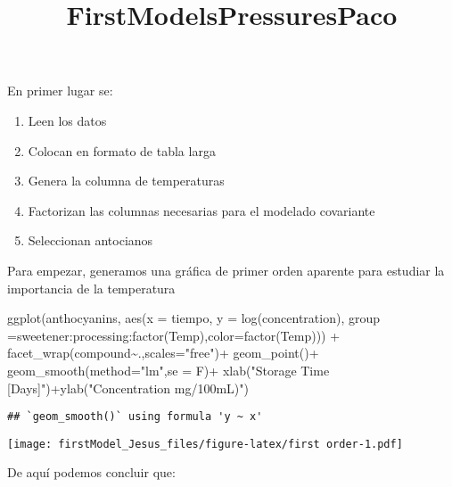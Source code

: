 \documentclass[
]{article}
\title{FirstModelsPressuresPaco}
\author{}
\date{\vspace{-2.5em}}
\newenvironment{Shaded}{\begin{snugshade}}{\end{snugshade}}
\newcommand{\AttributeTok}[1]{\textcolor[rgb]{0.77,0.63,0.00}{#1}}
\newcommand{\FunctionTok}[1]{\textcolor[rgb]{0.00,0.00,0.00}{#1}}
\newcommand{\NormalTok}[1]{#1}
\newcommand{\SpecialCharTok}[1]{\textcolor[rgb]{0.00,0.00,0.00}{#1}}
\newcommand{\StringTok}[1]{\textcolor[rgb]{0.31,0.60,0.02}{#1}}
\providecommand{\tightlist}{%
  \setlength{\itemsep}{0pt}\setlength{\parskip}{0pt}}
\begin{document}
\maketitle

En primer lugar se:

\begin{enumerate}
\def\labelenumi{\arabic{enumi}.}
\tightlist
\item
  Leen los datos
\item
  Colocan en formato de tabla larga
\item
  Genera la columna de temperaturas
\item
  Factorizan las columnas necesarias para el modelado covariante
\item
  Seleccionan antocianos
\end{enumerate}

Para empezar, generamos una gráfica de primer orden aparente para
estudiar la importancia de la temperatura

\begin{Shaded}
\begin{Highlighting}[]
\FunctionTok{ggplot}\NormalTok{(anthocyanins, }
       \FunctionTok{aes}\NormalTok{(}\AttributeTok{x =}\NormalTok{ tiempo, }\AttributeTok{y =} \FunctionTok{log}\NormalTok{(concentration), }\AttributeTok{group =}\NormalTok{sweetener}\SpecialCharTok{:}\NormalTok{processing}\SpecialCharTok{:}\FunctionTok{factor}\NormalTok{(Temp),}\AttributeTok{color=}\FunctionTok{factor}\NormalTok{(Temp))) }\SpecialCharTok{+}
  \FunctionTok{facet\_wrap}\NormalTok{(compound}\SpecialCharTok{\textasciitilde{}}\NormalTok{.,}\AttributeTok{scales=}\StringTok{"free"}\NormalTok{)}\SpecialCharTok{+}
  \FunctionTok{geom\_point}\NormalTok{()}\SpecialCharTok{+} \FunctionTok{geom\_smooth}\NormalTok{(}\AttributeTok{method=}\StringTok{"lm"}\NormalTok{,}\AttributeTok{se =}\NormalTok{ F)}\SpecialCharTok{+}
  \FunctionTok{xlab}\NormalTok{(}\StringTok{"Storage Time [Days]"}\NormalTok{)}\SpecialCharTok{+}\FunctionTok{ylab}\NormalTok{(}\StringTok{"Concentration mg/100mL)"}\NormalTok{)}
\end{Highlighting}
\end{Shaded}

\begin{verbatim}
## `geom_smooth()` using formula 'y ~ x'
\end{verbatim}

\texttt{[image: firstModel\_Jesus\_files/figure-latex/first order-1.pdf]}

De aquí podemos concluir que:
\end{document}
